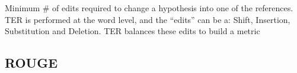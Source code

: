 \documentclass[11pt]{article}
\begin{document}
Minimum \# of edits required to change a hypothesis into one of the references. TER is performed at the word level, and the ``edits'' can be a: Shift, Insertion, Substitution and Deletion. TER balances these edits to build a metric

\subsection{ROUGE}

\begin{minipage}[l]{.5\linewidth}
    \centering
\end{minipage}\hfill
\end{document}
